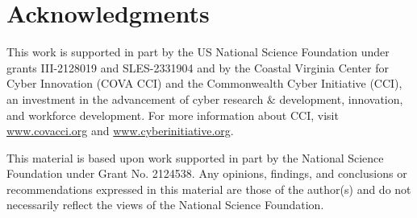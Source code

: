 \documentclass{article} %
\newcommand{\sz}[1]{({\color{red} {Shangtong: #1}})}
\newcommand{\0}{\mathbf{0}}
\begin{document}
\section*{Acknowledgments}
This work is supported in part by the US National Science Foundation under grants III-2128019 and SLES-2331904 and by the Coastal Virginia Center for Cyber Innovation (COVA CCI) and the Commonwealth Cyber Initiative (CCI), 
an investment in the advancement of cyber research $\text{\&}$ development, innovation, and workforce development. For more information about CCI, visit 
\url{www.covacci.org} and \url{www.cyberinitiative.org}.

This material is based upon work supported in part by the National Science Foundation under Grant No. 2124538. Any opinions, findings, and conclusions or recommendations expressed in this material are those of the author(s) and do not necessarily reflect the views of the National Science Foundation.






\end{document}
